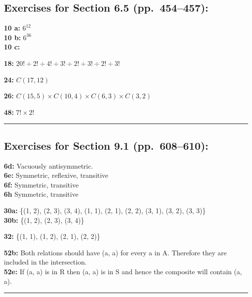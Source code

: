 \documentclass[12pt]{article}  %
\begin{document}
{{%

\subsection*{Exercises for Section 6.5 (pp.\ 454--457):}     

\noindent
{\bf 10 a:} $6^{12}$
\\
{\bf 10 b:} $6^{36}$
\\
{\bf 10 c:}

\noindent
{\bf 18:} $20! \div 2! \div 4! \div 3! \div 2! \div 3! \div 2! \div 3!$

\noindent
{\bf 24:} $C(17, 12)$

\noindent
{\bf 26:} $C(15, 5) \times C(10, 4) \times C(6, 3) \times C(3, 2)$

\noindent
{\bf 48:} $7! \times 2!$

\rule{6in}{.1pt}       %


\subsection*{Exercises for Section 9.1 (pp.\ 608--610):}     

\noindent
{\bf 6d:} {\normalfont Vacuously antisymmetric.}
\\
{\bf 6e:} {\normalfont Symmetric, reflexive, transitive}
\\
{\bf 6f:} {\normalfont Symmetric, transitive}
\\
{\bf 6h} {\normalfont Symmetric, transitive}


\noindent
{\bf 30a:} {\normalfont \{(1, 2), (2, 3), (3, 4), (1, 1), (2, 1), (2, 2), (3, 1), (3, 2), (3, 3)\}}
\\
{\bf 30b:} {\normalfont \{(1, 2), (2, 3), (3, 4)\}}

\noindent
{\bf 32:} {\normalfont \{(1, 1), (1, 2), (2, 1), (2, 2)\}}

\noindent
{\bf 52b:} {\normalfont Both relations should have (a, a) for every a in A. Therefore
they are included in the intersection. }
\\
{\bf 52e:} {\normalfont If (a, a) is in R then (a, a) is in S and hence 
the composite will contain (a, a). }

\rule{6in}{.1pt}       %

}}
\end{document}
